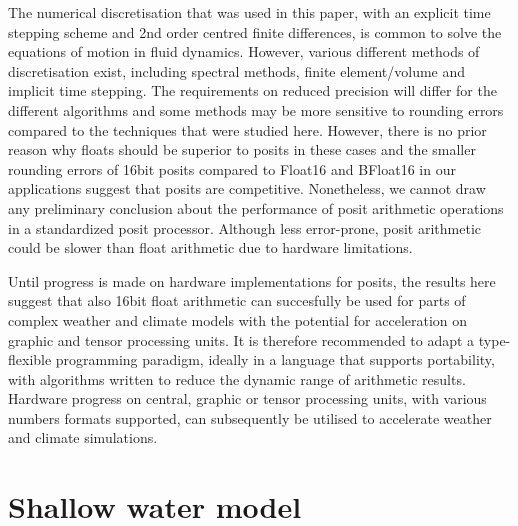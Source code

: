 \documentclass[draft]{agujournal2019}
\begin{document}
The numerical discretisation that was used in this paper, with an explicit time stepping scheme and 2nd order centred finite differences, is common to solve the equations of motion in fluid dynamics. However, various different methods of discretisation exist, including spectral methods, finite element/volume and implicit time stepping. The requirements on reduced precision will differ for the different algorithms and some methods may be more sensitive to rounding errors compared to the techniques that were studied here. However, there is no prior reason why floats should be superior to posits in these cases and the smaller rounding errors of 16bit posits compared to Float16 and BFloat16 in our applications suggest that posits are competitive. Nonetheless, we cannot draw any preliminary conclusion about the performance of posit arithmetic operations in a standardized posit processor. Although less error-prone, posit arithmetic could be slower than float arithmetic due to hardware limitations. 

Until progress is made on hardware implementations for posits, the results here suggest that also 16bit float arithmetic can succesfully be used for parts of complex weather and climate models with the potential for acceleration on graphic and tensor processing units. It is therefore recommended to adapt a type-flexible programming paradigm, ideally in a language that supports portability, with algorithms written to reduce the dynamic range of arithmetic results. Hardware progress on central, graphic or tensor processing units, with various numbers formats supported, can subsequently be utilised to accelerate weather and climate simulations.


\appendix
\section{Shallow water model}
\label{sec:app}
\end{document}
